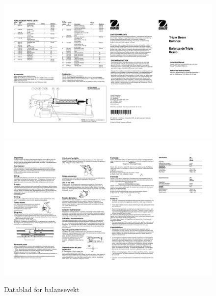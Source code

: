 \documentclass[reprint,norsk,notitlepage]{revtex4-2}
\begin{document}
\begin{figure}[!ht]
  \centering
  \includegraphics[width = .9\textwidth]{fig/balansevekt-ohaus-triple-beam-balance-manual.pdf}
  \includegraphics[width = .9\textwidth]{fig/balansevekt-ohaus-triple-beam-balance-manuals2.pdf}
  \caption{Datablad for balansevekt}
  \label{fig: datablad balansevekt}
\end{figure}
\end{document}
